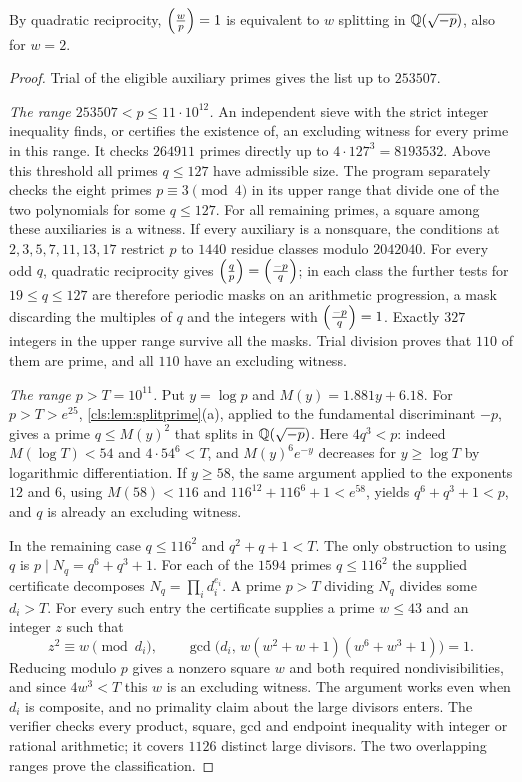 By quadratic reciprocity, $\Bigl(\frac{w}{p}\Bigr)=1$ is equivalent to $w$ splitting in
$\mathbb{Q}(\sqrt{-p})$, also for $w=2$.

\begin{proof}
Trial of the eligible auxiliary primes gives the list up to $253507$.

\emph{The range $253507<p\le11\cdot10^{12}$.} An independent sieve with the strict
integer inequality finds, or certifies the existence of, an excluding witness for every prime in this range. It
checks $264911$ primes directly up to $4\cdot127^3=8193532$. Above this threshold all
primes $q\le127$ have admissible size. The program separately checks the eight primes
$p\equiv3\pmod4$ in its upper range that divide one of the two polynomials for some
$q\le127$. For all remaining primes, a square among these auxiliaries is a witness. If
every auxiliary is a nonsquare, the conditions at $2,3,5,7,11,13,17$ restrict $p$ to
$1440$ residue classes modulo $2042040$. For every odd $q$, quadratic reciprocity gives
$\Bigl(\frac{q}{p}\Bigr)=\Bigl(\frac{-p}{q}\Bigr)$; in each class the further tests for $19\le q\le127$ are
therefore periodic masks on an arithmetic progression, a mask discarding the multiples
of $q$ and the integers with $\Bigl(\frac{-p}{q}\Bigr)=1$. Exactly $327$ integers in the upper
range survive all the masks. Trial division proves that $110$ of them are prime, and
all $110$ have an excluding witness.

\emph{The range $p>T=10^{11}$.} Put $y=\log p$ and $M(y)=1.881y+6.18$. For
$p>T>e^{25}$, \cref{cls:lem:splitprime}(a), applied to the fundamental discriminant
$-p$, gives a prime $q\le M(y)^2$ that splits in $\mathbb{Q}(\sqrt{-p})$. Here $4q^3<p$: indeed $M(\log T)<54$ and $4\cdot54^6<T$, and
$M(y)^6e^{-y}$ decreases for $y\ge\log T$ by logarithmic differentiation. If $y\ge58$,
the same argument applied to the exponents $12$ and $6$, using $M(58)<116$ and
$116^{12}+116^6+1<e^{58}$, yields $q^6+q^3+1<p$, and $q$ is already an excluding
witness.

In the remaining case $q\le116^2$ and $q^2+q+1<T$. The only obstruction to using $q$ is
$p\mid N_q=q^6+q^3+1$. For each of the $1594$ primes $q\le116^2$ the supplied
certificate decomposes $N_q=\prod_id_i^{e_i}$. A prime $p>T$ dividing $N_q$ divides some $d_i>T$. For every
such entry the certificate supplies a prime $w\le43$ and an integer $z$ such that
\[
 z^2\equiv w\pmod{d_i},\qquad
 \gcd\bigl(d_i,\,w(w^2+w+1)(w^6+w^3+1)\bigr)=1 .
\]
Reducing modulo $p$ gives a nonzero square $w$ and both required nondivisibilities, and
since $4w^3<T$ this $w$ is an excluding witness. The argument works even when $d_i$ is
composite, and no primality claim about the large divisors enters. The verifier checks
every product, square, gcd and endpoint inequality with integer or rational
arithmetic; it covers $1126$ distinct large divisors. The two overlapping ranges prove
the classification.
\end{proof}

